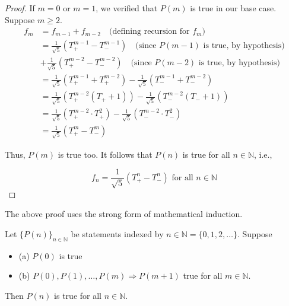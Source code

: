 \documentclass[11pt]{article}
\begin{document}
\begin{enumerate}
\begin{proof}
              If $m = 0$ or $m = 1$, we verified that $P(m)$ is true in our base case.
              Suppose $m \geq 2$.
              \[
                  \begin{aligned}
                      f_m & = f_{m-1} + f_{m-2} \quad \text{(defining recursion for } f_m\text{)}                                                 \\
                          & = \frac{1}{\sqrt{5}} \left( T_+^{m-1} - T_-^{m-1} \right) \quad \text{(since } P(m-1) \text{ is true, by hypothesis)} \\
                          & + \frac{1}{\sqrt{5}} \left( T_+^{m-2} - T_-^{m-2} \right) \quad \text{(since } P(m-2) \text{ is true, by hypothesis)} \\
                          & = \frac{1}{\sqrt{5}} \left( T_+^{m-1} + T_+^{m-2} \right) - \frac{1}{\sqrt{5}} \left( T_-^{m-1} + T_-^{m-2} \right)   \\
                          & = \frac{1}{\sqrt{5}} \left( T_+^{m-2} (T_+ + 1) \right) - \frac{1}{\sqrt{5}} \left( T_-^{m-2} (T_- + 1) \right)       \\
                          & = \frac{1}{\sqrt{5}} \left( T_+^{m-2} \cdot T_+^2 \right) - \frac{1}{\sqrt{5}} \left( T_-^{m-2} \cdot T_-^2 \right)   \\
                          & = \frac{1}{\sqrt{5}} \left( T_+^m - T_-^m \right)
                  \end{aligned}
              \]

              Thus, $P(m)$ is true too. It follows that $P(n)$ is true for all $n \in
                  \mathbb{N}$, i.e.,

              \[
                  f_n = \frac{1}{\sqrt{5}} \left( T_+^n - T_-^n \right) \text{ for all } n \in \mathbb{N}
              \]
          \end{proof}
          The above proof uses the strong form of mathematical induction.
\end{enumerate}
\begin{theorem} 
    Let $\{P(n)\}_{n \in \mathbb{N}}$ be statements indexed by $n \in \mathbb{N} = \{0, 1, 2, \ldots\}$. Suppose
    \begin{itemize}
        \item (a) $P(0)$ is true
        \item (b) $P(0), P(1), \ldots, P(m) \Rightarrow P(m+1)$ true for all $m \in \mathbb{N}$.
    \end{itemize}

    Then $P(n)$ is true for all $n \in \mathbb{N}$.
\end{theorem}
\end{document}
